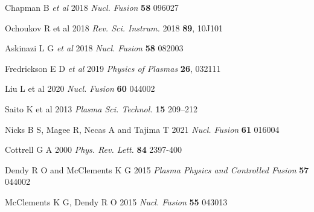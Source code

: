 \documentclass[12pt]{iopart}
\begin{document}
\begin{thebibliography}{9}
Chapman B \textit{et al} 2018 \textit{Nucl. Fusion} \textbf{58} 096027

Ochoukov R et al 2018 \textit{Rev. Sci. Instrum.} 2018 \textbf{89}, 10J101

Askinazi L G  \textit{et al} 2018 \textit{Nucl. Fusion} \textbf{58} 082003

Fredrickson E D \textit{et al} 2019 \textit{Physics of Plasmas} \textbf{26}, 032111

Liu L et al 2020  \textit{Nucl. Fusion} \textbf{60} 044002

Saito K et al 2013 \textit{Plasma Sci. Technol.} \textbf{15} 209–212

Nicks B S, Magee R, Necas A and Tajima T 2021 \textit{Nucl. Fusion} \textbf{61} 016004

Cottrell G A 2000 \textit{Phys. Rev. Lett.} \textbf{84} 2397-400

Dendy R O and McClements K G 2015 \textit{Plasma Physics and Controlled Fusion} \textbf{57} 044002

McClements K G, Dendy R O 2015 \textit{Nucl. Fusion} \textbf{55} 043013


\end{thebibliography}
\end{document}
